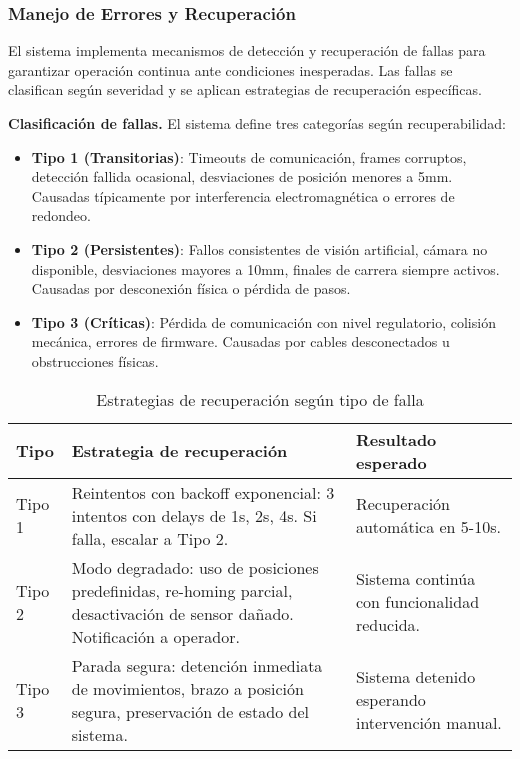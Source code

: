 \subsubsection{Manejo de Errores y Recuperación}

El sistema implementa mecanismos de detección y recuperación de fallas para garantizar operación continua ante condiciones inesperadas. Las fallas se clasifican según severidad y se aplican estrategias de recuperación específicas.

\textbf{Clasificación de fallas.} El sistema define tres categorías según recuperabilidad:

\begin{itemize}
    \item \textbf{Tipo 1 (Transitorias)}: Timeouts de comunicación, frames corruptos, detección fallida ocasional, desviaciones de posición menores a 5mm. Causadas típicamente por interferencia electromagnética o errores de redondeo.

    \item \textbf{Tipo 2 (Persistentes)}: Fallos consistentes de visión artificial, cámara no disponible, desviaciones mayores a 10mm, finales de carrera siempre activos. Causadas por desconexión física o pérdida de pasos.

    \item \textbf{Tipo 3 (Críticas)}: Pérdida de comunicación con nivel regulatorio, colisión mecánica, errores de firmware. Causadas por cables desconectados u obstrucciones físicas.
\end{itemize}

\begin{table}[H]
\centering
\small
\begin{tabular}{|l|p{5.5cm}|p{5.5cm}|}
\hline
\textbf{Tipo} & \textbf{Estrategia de recuperación} & \textbf{Resultado esperado} \\
\hline
Tipo 1 & Reintentos con backoff exponencial: 3 intentos con delays de 1s, 2s, 4s. Si falla, escalar a Tipo 2. & Recuperación automática en 5-10s. \\
\hline
Tipo 2 & Modo degradado: uso de posiciones predefinidas, re-homing parcial, desactivación de sensor dañado. Notificación a operador. & Sistema continúa con funcionalidad reducida. \\
\hline
Tipo 3 & Parada segura: detención inmediata de movimientos, brazo a posición segura, preservación de estado del sistema. & Sistema detenido esperando intervención manual. \\
\hline
\end{tabular}
\caption{Estrategias de recuperación según tipo de falla}
\label{tab:estrategias_recuperacion}
\end{table}

